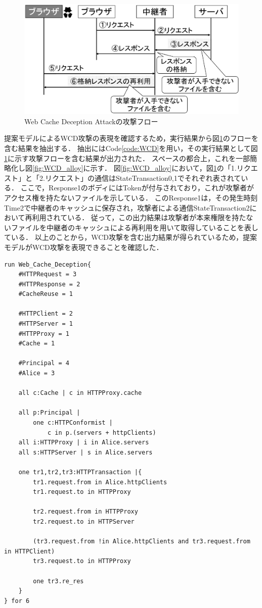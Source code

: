 \documentclass[12pt,a4paper]{jbook}
\begin{document}
\begin{figure}[htb]
\centering
\includegraphics[width=450pt]{./fig/WCD_flow.eps}
\caption{Web Cache Deception Attackの攻撃フロー}
\label{fig:WCD_flow}
\end{figure}

提案モデルによるWCD攻撃の表現を確認するため，実行結果から図\ref{fig:WCD_flow}のフローを含む結果を抽出する．
抽出にはCode\ref{code:WCD}を用い，その実行結果として図\ref{fig:WCD_flow}に示す攻撃フローを含む結果が出力された．
スペースの都合上，これを一部簡略化し図\ref{fig:WCD_alloy}に示す．
図\ref{fig:WCD_alloy}において，図\ref{fig:WCD_flow}の「1.リクエスト」と「2.リクエスト」の通信はStateTransaction0,1でそれぞれ表されている．
ここで，Response1のボディにはTokenが付与されており，これが攻撃者がアクセス権を持たないファイルを示している．
このResponse1は，その発生時刻Time2で中継者のキャッシュに保存され，攻撃者による通信StateTransaction2において再利用されている．
従って，この出力結果は攻撃者が本来権限を持たないファイルを中継者のキャッシュによる再利用を用いて取得していることを表している．
以上のことから，WCD攻撃を含む出力結果が得られているため，提案モデルがWCD攻撃を表現できることを確認した．

\begin{lstlisting}[caption=WCD攻撃の表現, label=code:WCD]
run Web_Cache_Deception{
	#HTTPRequest = 3
	#HTTPResponse = 2
	#CacheReuse = 1

	#HTTPClient = 2
	#HTTPServer = 1
	#HTTPProxy = 1
	#Cache = 1

	#Principal = 4
	#Alice = 3

	all c:Cache | c in HTTPProxy.cache

	all p:Principal |
		one c:HTTPConformist |
			c in p.(servers + httpClients)
	all i:HTTPProxy | i in Alice.servers
	all s:HTTPServer | s in Alice.servers

	one tr1,tr2,tr3:HTTPTransaction |{
		tr1.request.from in Alice.httpClients
		tr1.request.to in HTTPProxy

		tr2.request.from in HTTPProxy
		tr2.request.to in HTTPServer

		(tr3.request.from !in Alice.httpClients and tr3.request.from in HTTPClient)
		tr3.request.to in HTTPProxy

		one tr3.re_res
	}
} for 6
\end{lstlisting}
\end{document}
